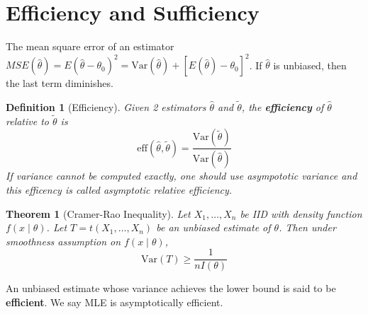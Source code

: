 \documentclass[12pt]{article}
\newcommand{\var}{\mathrm{Var}}
\newtheorem{definition}{Definition}[section]
\newtheorem{theorem}{Theorem}[section]
\theoremstyle{definition}
\begin{document}
\section{Efficiency and Sufficiency}
The mean square error of an estimator $MSE(\hat{\theta})=E(\hat{\theta}-\theta_0)^2=\var(\hat{\theta})+[E(\hat{\theta})-\theta_0]^2$. If $\hat{\theta}$ is unbiased, then the last term diminishes.
\begin{definition}[Efficiency]
\normalfont Given 2 estimators $\hat{\theta}$ and $\tilde{\theta}$, the \textbf{efficiency} of $\hat{\theta}$ relative to $\tilde{\theta}$ is
\[
\text{eff}(\hat{\theta},\tilde{\theta})=\frac{\var(\tilde{\theta})}{\var(\hat{\theta})}
\]
If variance cannot be computed exactly, one should use asympototic variance and this efficency is called asymptotic relative efficiency.
\end{definition}
\begin{theorem}[Cramer-Rao Inequality]
\normalfont Let $X_1,\ldots, X_n$ be IID with density function $f(x\mid \theta)$. Let $T=t(X_1,\ldots, X_n)$ be an unbiased estimate of $\theta$. Then under smoothness assumption on $f(x\mid \theta)$,
\[
\var(T)\geq \frac{1}{nI(\theta)}
\]
\end{theorem}
An unbiased estimate whose variance achieves the lower bound is said to be \textbf{efficient}. We say MLE is asymptotically efficient.
\end{document}
